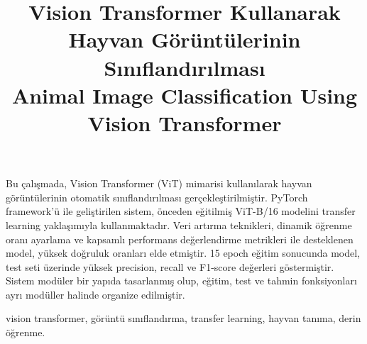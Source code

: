 \documentclass[conference, a4paper]{IEEEtran}
\begin{document}
\title{Vision Transformer Kullanarak Hayvan Görüntülerinin Sınıflandırılması\\
	Animal Image Classification Using Vision Transformer}

\author{
	\and
	\and
}

	\maketitle
	
	\begin{ozet}
		Bu çalışmada, Vision Transformer (ViT) mimarisi kullanılarak hayvan görüntülerinin otomatik sınıflandırılması gerçekleştirilmiştir. PyTorch framework'ü ile geliştirilen sistem, önceden eğitilmiş ViT-B/16 modelini transfer learning yaklaşımıyla kullanmaktadır. Veri artırma teknikleri, dinamik öğrenme oranı ayarlama ve kapsamlı performans değerlendirme metrikleri ile desteklenen model, yüksek doğruluk oranları elde etmiştir. 15 epoch eğitim sonucunda model, test seti üzerinde yüksek precision, recall ve F1-score değerleri göstermiştir. Sistem modüler bir yapıda tasarlanmış olup, eğitim, test ve tahmin fonksiyonları ayrı modüller halinde organize edilmiştir.
	\end{ozet}
	\begin{IEEEanahtar}
		vision transformer, görüntü sınıflandırma, transfer learning, hayvan tanıma, derin öğrenme.
	\end{IEEEanahtar}
	
\end{document}
